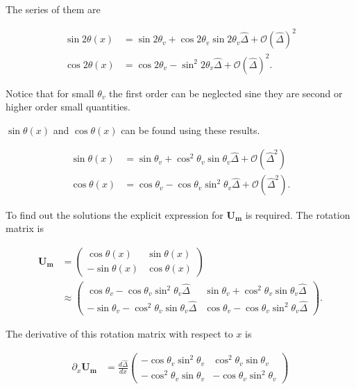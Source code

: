 \documentclass{tufte-handout}
\begin{document}
The series of them are

\begin{align*}
\sin 2\theta(x) & = \sin 2\theta_v + \cos 2\theta_v \sin 2\theta_v \hat\Delta + \mathcal{O}(\hat\Delta)^2 \\
\cos 2\theta(x) & = \cos 2\theta_v -\sin^2 2\theta_v \hat \Delta + \mathcal{O}(\hat\Delta)^2 .
\end{align*}

Notice that for small $\theta_v$ the first order can be neglected sine they are second or higher order small quantities.

$\sin\theta(x)$ and $\cos\theta(x)$ can be found using these results.

\begin{align*}
\sin\theta(x) & = \sin \theta_v + \cos^2\theta_v \sin\theta_v \hat\Delta + \mathcal{O}(\hat\Delta^2) \\
\cos\theta(x) & = \cos\theta_v - \cos\theta_v \sin^2\theta_v \hat\Delta + \mathcal{O}(\hat\Delta^2).
\end{align*}

To find out the solutions the explicit expression for $\mathbf{U_m}$ is required. The rotation matrix is

\begin{align*}
\mathbf{U_m} &= \begin{pmatrix} \cos \theta(x) & \sin\theta(x) \\ -\sin\theta(x) & \cos\theta(x) \end{pmatrix} \\
&\approx \begin{pmatrix}
\cos\theta_v - \cos\theta_v \sin^2\theta_v \hat\Delta &  \sin \theta_v + \cos^2\theta_v \sin\theta_v \hat\Delta \\
-  \sin \theta_v - \cos^2\theta_v \sin\theta_v \hat\Delta & \cos\theta_v - \cos\theta_v \sin^2\theta_v \hat\Delta
\end{pmatrix}.
\end{align*}

The derivative of this rotation matrix with respect to $x$ is

\begin{align*}
\partial_x \mathbf{U_m} & = \frac{d \hat\Delta}{dx} \begin{pmatrix}
 - \cos\theta_v \sin^2\theta_v  &  \cos^2\theta_v \sin\theta_v  \\
 - \cos^2\theta_v \sin\theta_v  &  - \cos\theta_v \sin^2\theta_v 
\end{pmatrix}
\end{align*}
\end{document}
